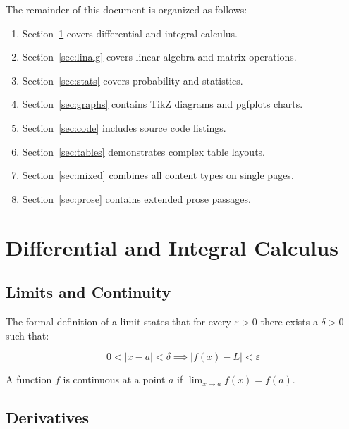 \documentclass[11pt]{article}
\begin{document}
The remainder of this document is organized as follows:
\begin{enumerate}
  \item Section~\ref{sec:calculus} covers differential and integral calculus.
  \item Section~\ref{sec:linalg} covers linear algebra and matrix operations.
  \item Section~\ref{sec:stats} covers probability and statistics.
  \item Section~\ref{sec:graphs} contains TikZ diagrams and pgfplots charts.
  \item Section~\ref{sec:code} includes source code listings.
  \item Section~\ref{sec:tables} demonstrates complex table layouts.
  \item Section~\ref{sec:mixed} combines all content types on single pages.
  \item Section~\ref{sec:prose} contains extended prose passages.
\end{enumerate}

\lipsum[1-2]

\newpage

\section{Differential and Integral Calculus}
\label{sec:calculus}

\subsection{Limits and Continuity}

The formal definition of a limit states that for every $\varepsilon > 0$
there exists a $\delta > 0$ such that:

\begin{equation}
  0 < |x - a| < \delta \implies |f(x) - L| < \varepsilon
  \label{eq:limit}
\end{equation}

A function $f$ is continuous at a point $a$ if
$\lim_{x \to a} f(x) = f(a)$.

\subsection{Derivatives}
\end{document}
